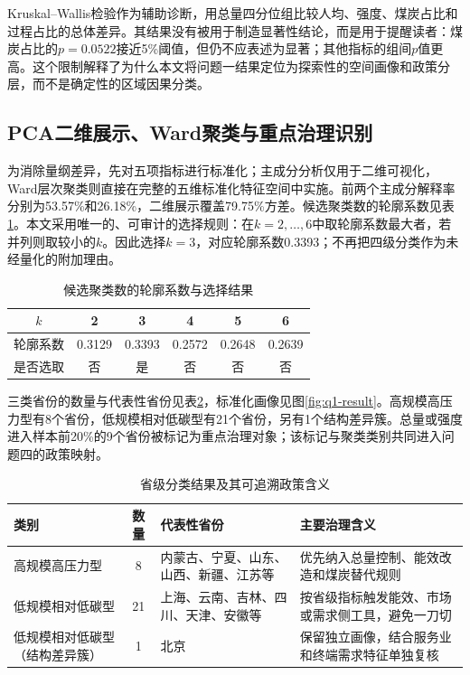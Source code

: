 \documentclass[12pt,a4paper]{ctexart}
\theoremstyle{definition}
\theoremstyle{plain}
\theoremstyle{remark}
\begin{document}
Kruskal--Wallis检验作为辅助诊断，用总量四分位组比较人均、强度、煤炭占比和过程占比的总体差异。其结果没有被用于制造显著性结论，而是用于提醒读者：煤炭占比的$p=0.0522$接近5\%阈值，但仍不应表述为显著；其他指标的组间$p$值更高。这个限制解释了为什么本文将问题一结果定位为探索性的空间画像和政策分层，而不是确定性的区域因果分类。
\subsection{PCA二维展示、Ward聚类与重点治理识别}
为消除量纲差异，先对五项指标进行标准化；主成分分析仅用于二维可视化，Ward层次聚类则直接在完整的五维标准化特征空间中实施\cite{ward}。前两个主成分解释率分别为53.57\%和26.18\%，二维展示覆盖79.75\%方差。候选聚类数的轮廓系数见表\ref{tab:silhouette}。本文采用唯一的、可审计的选择规则：在$k=2,\ldots,6$中取轮廓系数最大者，若并列则取较小的$k$。因此选择$k=3$，对应轮廓系数0.3393；不再把四级分类作为未经量化的附加理由。

\begin{table}[H]
\centering
\caption{候选聚类数的轮廓系数与选择结果}
\label{tab:silhouette}
\begin{tabular}{cccccc}
\toprule
$k$ & 2 & 3 & 4 & 5 & 6\\
\midrule
轮廓系数 & 0.3129 & 0.3393 & 0.2572 & 0.2648 & 0.2639\\
是否选取 & 否 & 是 & 否 & 否 & 否\\
\bottomrule
\end{tabular}
\end{table}

三类省份的数量与代表性省份见表\ref{tab:cluster}，标准化画像见图\ref{fig:q1-result}。高规模高压力型有8个省份，低规模相对低碳型有21个省份，另有1个结构差异簇。总量或强度进入样本前20\%的9个省份被标记为重点治理对象；该标记与聚类类别共同进入问题四的政策映射。

\begin{table}[H]
\centering
\caption{省级分类结果及其可追溯政策含义}
\label{tab:cluster}
\begin{tabular}{>{\raggedright\arraybackslash}p{3.4cm}c>{\raggedright\arraybackslash}p{4.6cm}>{\raggedright\arraybackslash}p{3.0cm}}
\toprule
类别 & 数量 & 代表性省份 & 主要治理含义\\
\midrule
高规模高压力型 & 8 & 内蒙古、宁夏、山东、山西、新疆、江苏等 & 优先纳入总量控制、能效改造和煤炭替代规则\\
低规模相对低碳型 & 21 & 上海、云南、吉林、四川、天津、安徽等 & 按省级指标触发能效、市场或需求侧工具，避免一刀切\\
低规模相对低碳型（结构差异簇） & 1 & 北京 & 保留独立画像，结合服务业和终端需求特征单独复核\\
\bottomrule
\end{tabular}
\end{table}
\end{document}
